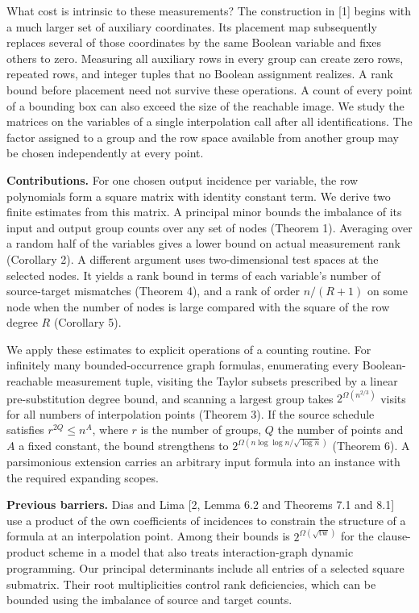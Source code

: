 \documentclass[
  10pt,
]{article}
\begin{document}
What cost is intrinsic to these measurements? The construction in
{[}1{]} begins with a much larger set of auxiliary coordinates. Its
placement map subsequently replaces several of those coordinates by the
same Boolean variable and fixes others to zero. Measuring all auxiliary
rows in every group can create zero rows, repeated rows, and integer
tuples that no Boolean assignment realizes. A rank bound before
placement need not survive these operations. A count of every point of a
bounding box can also exceed the size of the reachable image. We study
the matrices on the variables of a single interpolation call after all
identifications. The factor assigned to a group and the row space
available from another group may be chosen independently at every point.

\textbf{Contributions.} For one chosen output incidence per variable,
the row polynomials form a square matrix with identity constant term. We
derive two finite estimates from this matrix. A principal minor bounds
the imbalance of its input and output group counts over any set of nodes
(Theorem 1). Averaging over a random half of the variables gives a lower
bound on actual measurement rank (Corollary 2). A different argument
uses two-dimensional test spaces at the selected nodes. It yields a rank
bound in terms of each variable's number of source-target mismatches
(Theorem 4), and a rank of order \(n/(R+1)\) on some node when the
number of nodes is large compared with the square of the row degree
\(R\) (Corollary 5).

We apply these estimates to explicit operations of a counting routine.
For infinitely many bounded-occurrence graph formulas, enumerating every
Boolean-reachable measurement tuple, visiting the Taylor subsets
prescribed by a linear pre-substitution degree bound, and scanning a
largest group takes \(2^{\Omega(n^{2/3})}\) visits for all numbers of
interpolation points (Theorem 3). If the source schedule satisfies
\(r^{2Q}\le n^A\), where \(r\) is the number of groups, \(Q\) the number
of points and \(A\) a fixed constant, the bound strengthens to
\(2^{\Omega(n\log\log n/\sqrt{\log n})}\) (Theorem 6). A parsimonious
extension carries an arbitrary input formula into an instance with the
required expanding scopes.

\textbf{Previous barriers.} Dias and Lima {[}2, Lemma 6.2 and Theorems
7.1 and 8.1{]} use a product of the own coefficients of incidences to
constrain the structure of a formula at an interpolation point. Among
their bounds is \(2^{\Omega(\sqrt{\operatorname{tw}})}\) for the
clause-product scheme in a model that also treats interaction-graph
dynamic programming. Our principal determinants include all entries of a
selected square submatrix. Their root multiplicities control rank
deficiencies, which can be bounded using the imbalance of source and
target counts.
\end{document}
